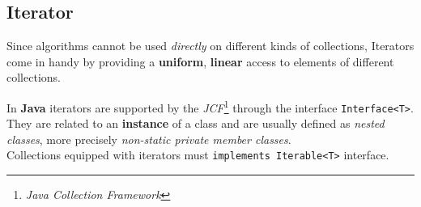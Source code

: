 \subsection{Iterator}
Since algorithms cannot be used \textit{directly} on different kinds of collections,
Iterators come in handy by providing a \textbf{uniform}, \textbf{linear} access to elements of different collections.

In \textbf{Java} iterators are supported by the \textit{JCF}\footnote{\textit{Java Collection Framework}} through the interface \lstinline|Interface<T>|.
They are related to an \textbf{instance} of a class and are usually defined as \textit{nested classes},
more precisely \textit{non-static private member classes}.\\
Collections equipped with iterators must \lstinline|implements Iterable<T>| interface.